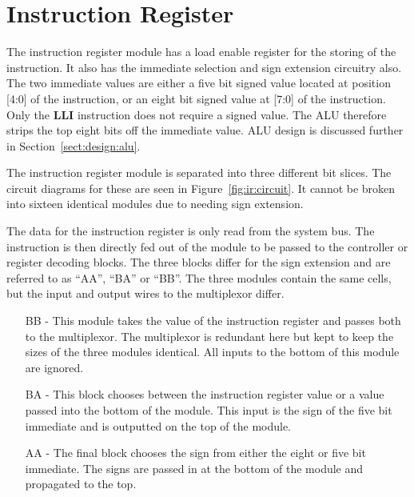 
\section{Instruction Register}


The instruction register module has a load enable register for the storing of the instruction.
It also has the immediate selection and sign extension circuitry also.
The two immediate values are either a five bit signed value located at position [4:0] of the instruction, or an eight bit signed value at [7:0] of the instruction.
Only the \textbf{LLI} instruction does not require a signed value. 
The ALU therefore strips the top eight bits off the immediate value. 
ALU design is discussed further in Section~\ref{sect:design:alu}.


The instruction register module is separated into three different bit slices.
The circuit diagrams for these are seen in Figure~\ref{fig:ir:circuit}.
It cannot be broken into sixteen identical modules due to needing sign extension. 

The data for the instruction register is only read from the system bus. 
The instruction is then directly fed out of the module to be passed to the controller or register decoding blocks.
The three blocks differ for the sign extension and are referred to as ``AA'', ``BA'' or ``BB''.
The three modules contain the same cells, but the input and output wires to the multiplexor differ. 
\begin{enumerate}
\item[BB] - This module takes the value of the instruction register and passes both to the multiplexor. The multiplexor is redundant here but kept to keep the sizes of the three modules identical. All inputs to the bottom of this module are ignored.
\item[BA] - This block chooses between the instruction register value or a value passed into the bottom of the module. This input is the sign of the five bit immediate and is outputted on the top of the module.
\item[AA] - The final block chooses the sign from either the eight or five bit immediate. The signs are passed in at the bottom of the module and propagated to the top. 
\end{enumerate}

